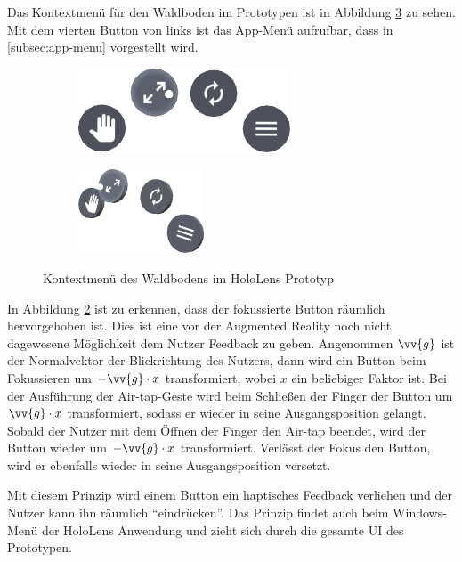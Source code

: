 Das Kontextmenü für den Waldboden im Prototypen ist in Abbildung \ref{fig:context-menu} zu sehen. Mit dem vierten Button von links ist das App-Menü aufrufbar, dass in \ref{subsec:app-menu} vorgestellt wird. 

\begin{figure}[htb]
  \centering
  \begin{subfigure}[b]{\fwidth}
    \centering
    \includegraphics[height=2.5cm]{figures/context-menu-front}
     \label{fig:context-menu-front}
  \end{subfigure}
  \begin{subfigure}[b]{\fwidth}
    \centering
  	\includegraphics[height=2.5cm]{figures/context-menu-side}
  	 \label{fig:context-menu-side}
  \end{subfigure}
  \caption{Kontextmenü des Waldbodens im HoloLens Prototyp} \label{fig:context-menu}
\end{figure}

In Abbildung \ref{fig:context-menu-side} ist zu erkennen, dass der fokussierte Button räumlich hervorgehoben ist. Dies ist eine vor der Augmented Reality noch nicht dagewesene Möglichkeit dem Nutzer Feedback zu geben. Angenommen $\vv{g}$ ist der Normalvektor der Blickrichtung des Nutzers, dann wird ein Button beim Fokussieren um $-\vv{g} \cdot x$ transformiert, wobei $x$ ein beliebiger Faktor ist. Bei der Ausführung der Air-tap-Geste wird beim Schließen der Finger der Button um $\vv{g} \cdot x$ transformiert, sodass er wieder in seine Ausgangsposition gelangt. Sobald der Nutzer mit dem Öffnen der Finger den Air-tap beendet, wird der Button wieder um $-\vv{g} \cdot x$ transformiert. Verlässt der Fokus den Button, wird er ebenfalls wieder in seine Ausgangsposition versetzt.

Mit diesem Prinzip wird einem Button ein haptisches Feedback verliehen und der Nutzer kann ihn räumlich "`eindrücken"'. Das Prinzip findet auch beim Windows-Menü der HoloLens Anwendung und zieht sich durch die gesamte UI des Prototypen.

